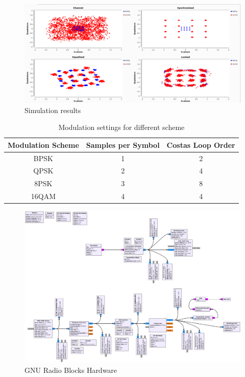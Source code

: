 \begin{figure}
	\includegraphics[width=\linewidth]{./figures/screenshots/QAM16_Fading_2_.png}
	\caption{Simulation results}
	\label{fig:simul16QAM_1}	
\end{figure}

\begin{table}[]
	\centering
	\caption{Modulation settings for different scheme}
	\begin{tabular}{ccc}
		\toprule
		Modulation Scheme & Samples per Symbol & Costas Loop Order\\
		\midrule
		BPSK  & 1 & 2 \\
		QPSK  & 2 & 4 \\
		8PSK  & 3 & 8 \\
		16QAM & 4 & 4 \\
		\bottomrule
	\end{tabular}
	\label{tab:modulation_settings}
\end{table}

\begin{figure}
	\includegraphics[width=\linewidth]{./figures/pdfs/qam_Hardware_1711.pdf}
	\caption{GNU Radio Blocks Hardware}
	\label{fig:simul16QAM_Hardware_Aufbau}	
\end{figure}

